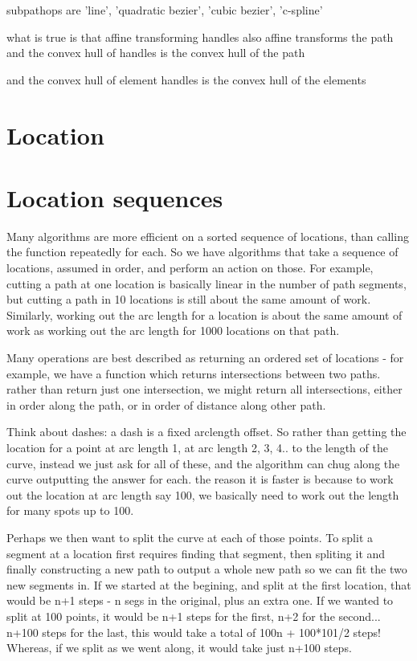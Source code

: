 subpathops are 'line', 'quadratic bezier', 'cubic bezier', 'c-spline'

what is true is that affine transforming handles also affine transforms the path
and the convex hull of handles is the convex hull of the path

and the convex hull of element handles is the convex hull of the elements

\section{Location}

\section{Location sequences}

Many algorithms are more efficient on a sorted sequence of locations,
than calling the function repeatedly for each.  So we have algorithms
that take a sequence of locations, assumed in order, and perform an
action on those.  For example, cutting a path at one location is
basically linear in the number of path segments, but cutting a path in
10 locations is still about the same amount of work.  Similarly,
working out the arc length for a location is about the same amount of
work as working out the arc length for 1000 locations on that path.

Many operations are best described as returning an ordered set of
locations - for example, we have a function which returns
intersections between two paths.  rather than return just one
intersection, we might return all intersections, either in order along
the path, or in order of distance along other path.

Think about dashes: a dash is a fixed arclength offset.  So rather
than getting the location for a point at arc length 1, at arc length
2, 3, 4.. to the length of the curve, instead we just ask for all of
these, and the algorithm can chug along the curve outputting the
answer for each.  the reason it is faster is because to work out the
location at arc length say 100, we basically need to work out the
length for many spots up to 100.

Perhaps we then want to split the curve at each of those points.  To
split a segment at a location first requires finding that segment,
then spliting it and finally constructing a new path to output a whole
new path so we can fit the two new segments in.  If we started at the
begining, and split at the first location, that would be n+1 steps - n
segs in the original, plus an extra one.  If we wanted to split at 100
points, it would be n+1 steps for the first, n+2 for the
second... n+100 steps for the last, this would take a total of 100n +
100*101/2 steps!  Whereas, if we split as we went along, it would take
just n+100 steps.

